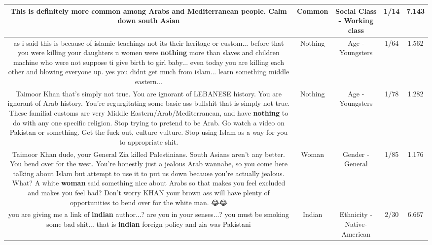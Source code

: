 \documentclass[11pt]{article}
\newlength\mylength
\begin{document}
\begin{center}
\begin{longtable}{|C{.65\mylength}|C{.30\mylength}|C{.12\mylength}|C{.12\mylength}|C{.12\mylength}|}
  \small This is definitely more \textbf{common} among Arabs and Mediterranean people. Calm down south Asian\normalsize   & Common & Social Class - Working class & 1/14 & 7.143 \\  \hline
  \small as i said this is because of islamic teachings not its their heritage or custom... before that you were killing your daughters n women were \textbf{nothing} more than slaves and children machine who were not suppose ti give birth to girl baby... even today you are killing each other and blowing everyone up. yes you didnt get much from islam... learn something middle eastern...\normalsize   & Nothing & Age - Youngsters & 1/64 & 1.562 \\  \hline
  \small Taimoor Khan that's simply not true. You are ignorant of LEBANESE history. You are ignorant of Arab history. You're regurgitating some basic ass bullshit that is simply not true. These familial customs are very Middle Eastern/Arab/Mediterranean, and have \textbf{nothing} to do with any one specific religion. Stop trying to pretend to be Arab. Go watch a video on Pakistan or something. Get the fuck out, culture vulture. Stop using Islam as a way for you to appropriate shit.\normalsize   & Nothing & Age - Youngsters & 1/78 & 1.282 \\  \hline
  \small Taimoor Khan dude, your General Zia killed Palestinians. South Asians aren't any better. You bend over for the west. You're honestly just a jealous Arab wannabe, so you come here talking about Islam but attempt to use it to put us down because you're actually jealous. What? A white \textbf{woman} said something nice about Arabs so that makes you feel excluded and makes you feel bad? Don't worry KHAN your brown ass will have plenty of opportunities to bend over for the white man. 😂😂\normalsize   & Woman & Gender - General & 1/85 & 1.176 \\  \hline
  \small you are giving me a link of \textbf{indian} author...? are you in your senses...? you must be smoking some bad shit... that is \textbf{indian} foreign policy and zia was Pakistani\normalsize   & Indian & Ethnicity - Native-American & 2/30 & 6.667 \\  \hline

\end{longtable}
\end{center}
\end{document}
